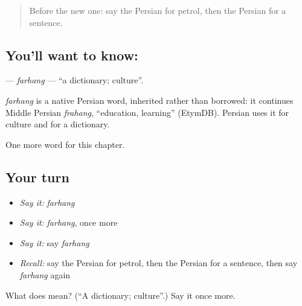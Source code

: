 \begin{quote}
Before the new one: say the Persian for petrol, then the Persian for a sentence.
\end{quote}

\subsection*{You'll want to know: }
\textbf{} — \emph{farhang} — \textquotedblleft{}a dictionary; culture\textquotedblright{}.

\begin{cousinweb}
\emph{farhang} is a native Persian word, inherited rather than borrowed: it continues Middle Persian \emph{frahang}, \textquotedblleft{}education, learning\textquotedblright{} (EtymDB). Persian uses it for culture and for a dictionary.
\end{cousinweb}

\begin{grammarlens}[title={What you've built}]
One more word for this chapter.
\end{grammarlens}

\subsection*{Your turn}
\begin{itemize}
\raggedright
  \item \emph{Say it:} \emph{farhang}
  \item \emph{Say it:} \emph{farhang}, once more
  \item \emph{Say it:} say \emph{farhang}
  \item \emph{Recall:} say the Persian for petrol, then the Persian for a sentence, then say \emph{farhang} again
\end{itemize}

\begin{tcolorbox}[breakable,colback=teal!4,colframe=teal!35!black,title={Before you move on}]
What does  mean? (\textquotedblleft{}A dictionary; culture\textquotedblright{}.) Say it once more.
\end{tcolorbox}

